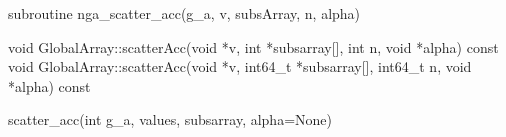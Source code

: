 \documentclass[12pt]{article}
\begin{document}
\begin{fapi}
\begin{fcode}
subroutine nga_scatter_acc(g_a, v, subsArray, n, alpha)
\end{fcode}
\begin{funcargs}
\end{funcargs}
\end{fapi}

\begin{cxxapi}
\begin{cxxcode}
void GlobalArray::scatterAcc(void *v, int *subsarray[], int n, void *alpha) const
void GlobalArray::scatterAcc(void *v, int64_t *subsarray[], int64_t n, void *alpha) const
\end{cxxcode}
\begin{funcargs}
\end{funcargs}
\end{cxxapi}

\begin{pyapi}
\begin{pycode}
scatter_acc(int g_a, values, subsarray, alpha=None) 
\end{pycode}
\end{pyapi}
\end{document}
